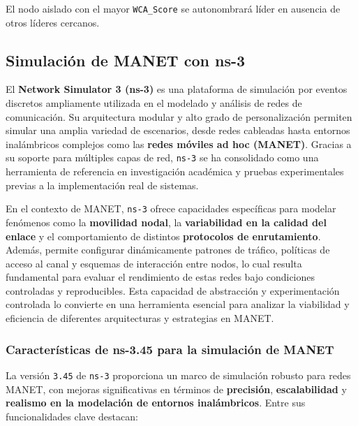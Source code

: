 \documentclass{article}
\begin{document}
El nodo aislado con el mayor \texttt{WCA\_Score} se autonombrará líder en ausencia de otros líderes cercanos.


\subsection{Simulación de MANET con ns-3}
El \textbf{Network Simulator 3 (ns-3)} es una plataforma de simulación por eventos discretos ampliamente utilizada en el modelado y análisis de redes de comunicación. Su arquitectura modular y alto grado de personalización permiten simular una amplia variedad de escenarios, desde redes cableadas hasta entornos inalámbricos complejos como las \textbf{redes móviles ad hoc (MANET)}. Gracias a su soporte para múltiples capas de red, \texttt{ns-3} se ha consolidado como una herramienta de referencia en investigación académica y pruebas experimentales previas a la implementación real de sistemas.

En el contexto de MANET, \texttt{ns-3} ofrece capacidades específicas para modelar fenómenos como la \textbf{movilidad nodal}, la \textbf{variabilidad en la calidad del enlace} y el comportamiento de distintos \textbf{protocolos de enrutamiento}. Además, permite configurar dinámicamente patrones de tráfico, políticas de acceso al canal y esquemas de interacción entre nodos, lo cual resulta fundamental para evaluar el rendimiento de estas redes bajo condiciones controladas y reproducibles. Esta capacidad de abstracción y experimentación controlada lo convierte en una herramienta esencial para analizar la viabilidad y eficiencia de diferentes arquitecturas y estrategias en MANET.


\subsubsection{Características de ns-3.45 para la simulación de MANET}
La versión \texttt{3.45} de \texttt{ns-3} proporciona un marco de simulación robusto para redes MANET, con mejoras significativas en términos de \textbf{precisión}, \textbf{escalabilidad} y \textbf{realismo en la modelación de entornos inalámbricos}. Entre sus funcionalidades clave destacan:
\end{document}
